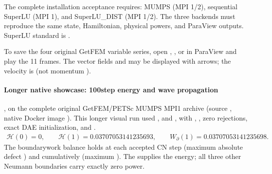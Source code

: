 \documentclass[letterpaper,10pt,english]{sphinxmanual}
\begin{document}
\sphinxAtStartPar
The complete installation acceptance requires:
MUMPS (MPI 1/2), sequential SuperLU (MPI 1),
and SuperLU\_DIST (MPI 1/2). The three backends
must reproduce the same state, Hamiltonian,
physical powers, and ParaView outputs.
SuperLU standard is .

\sphinxAtStartPar
To save the four original GetFEM variable series,
open ,
,  or
 in ParaView and play the
11 frames. The vector fields  and
 may be displayed with arrows; the
velocity is  (not momentum ).


\paragraph{Longer native showcase: 100\sphinxhyphen{}step energy and wave propagation}
\label{\detokenize{examples/wave:longer-native-showcase-100-step-energy-and-wave-propagation}}
\sphinxAtStartPar
{}, on the complete original
GetFEM/PETSc MUMPS MPI1 archive
(source ,
native Docker image ).
This longer visual run used , 
and , with , , zero
rejections, exact DAE initialization, and
.
\begin{equation*}
\begin{split}\mathcal H(0)=0,\qquad
\mathcal H(1)=0.03707053141235693,\qquad
W_{\partial}(1)=0.03707053141235698.\end{split}
\end{equation*}
\sphinxAtStartPar
The  boundary\sphinxhyphen{}work balance
 holds at each
accepted CN step (maximum absolute defect
) and cumulatively (maximum
). The  supplies the energy; all three other
Neumann boundaries carry exactly zero power.
\end{document}
